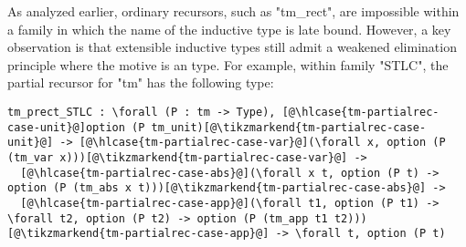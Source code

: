 As analyzed earlier, ordinary recursors, such as "tm_rect", are impossible
within a family in which the name of the inductive type is late bound.
However,
a key observation is that extensible inductive types still admit a
weakened elimination principle where the motive is an  type.
For example, within family "STLC", the partial recursor for
"tm" has the following type:

\begin{centered}
\begin{minipage}{\textwidth}
\newcommand\hlcase[1]{\tikzmarkin[disable rounded corners=true,set fill color=yellow!18,set border color=yellow!18]{#1}(0.00,-0.05)(-0.00,0.20)}
\begin{lstlisting}[basicstyle=\fontsize{8.25}{9.9}\ttfamily]
tm_prect_STLC : \forall (P : tm -> Type), [@\hlcase{tm-partialrec-case-unit}@]option (P tm_unit)[@\tikzmarkend{tm-partialrec-case-unit}@] -> [@\hlcase{tm-partialrec-case-var}@](\forall x, option (P (tm_var x)))[@\tikzmarkend{tm-partialrec-case-var}@] ->
  [@\hlcase{tm-partialrec-case-abs}@](\forall x t, option (P t) -> option (P (tm_abs x t)))[@\tikzmarkend{tm-partialrec-case-abs}@] ->
  [@\hlcase{tm-partialrec-case-app}@](\forall t1, option (P t1) -> \forall t2, option (P t2) -> option (P (tm_app t1 t2)))[@\tikzmarkend{tm-partialrec-case-app}@] -> \forall t, option (P t)
\end{lstlisting}
\end{minipage}
\end{centered}


